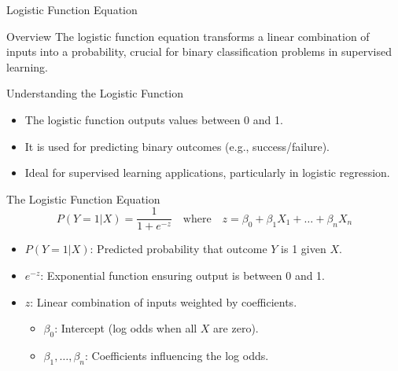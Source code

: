 \documentclass[aspectratio=169]{beamer}
\begin{document}
\begin{frame}[fragile]{Logistic Function Equation}
    \begin{block}{Overview}
        The logistic function equation transforms a linear combination of inputs into a probability, crucial for binary classification problems in supervised learning.
    \end{block}
\end{frame}

\begin{frame}[fragile]{Understanding the Logistic Function}
    \begin{itemize}
        \item The logistic function outputs values between 0 and 1.
        \item It is used for predicting binary outcomes (e.g., success/failure).
        \item Ideal for supervised learning applications, particularly in logistic regression.
    \end{itemize}
\end{frame}

\begin{frame}[fragile]{The Logistic Function Equation}
    \begin{equation}
        P(Y=1|X) = \frac{1}{1 + e^{-z}} \quad \text{where} \quad z = \beta_0 + \beta_1X_1 + \dots + \beta_nX_n 
    \end{equation}
    
    \begin{itemize}
        \item \(P(Y=1|X)\): Predicted probability that outcome \(Y\) is 1 given \(X\).
        \item \(e^{-z}\): Exponential function ensuring output is between 0 and 1.
        \item \(z\): Linear combination of inputs weighted by coefficients.
        \begin{itemize}
            \item \(\beta_0\): Intercept (log odds when all \(X\) are zero).
            \item \(\beta_1, \ldots, \beta_n\): Coefficients influencing the log odds.
        \end{itemize}
    \end{itemize}
\end{frame}
\end{document}
